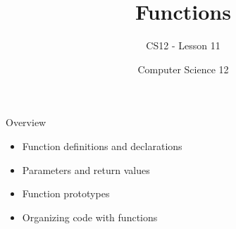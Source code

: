 \documentclass[10pt]{beamer}
\title{Functions}
\subtitle{CS12 - Lesson 11}
\author{Computer Science 12}
\date{}
\begin{document}
\begin{frame}
    \titlepage
\end{frame}

\begin{frame}{Overview}
    \begin{itemize}
        \item Function definitions and declarations
        \item Parameters and return values
        \item Function prototypes
        \item Organizing code with functions
    \end{itemize}
\end{frame}

\end{document}
